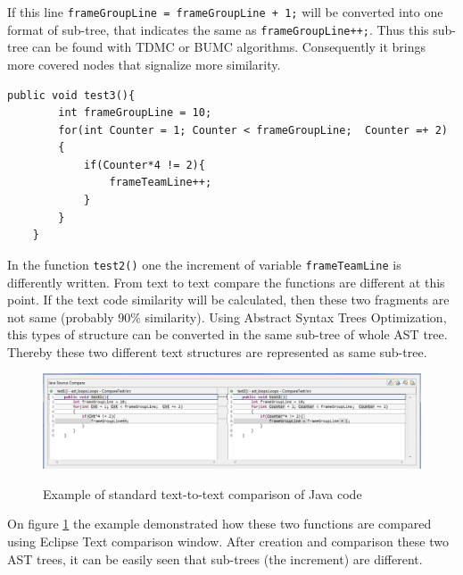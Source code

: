 \documentclass{report}
\begin{document}
If this line \texttt{frameGroupLine = frameGroupLine + 1;} will be converted into one format of sub-tree, that indicates the same as \texttt{frameGroupLine++;}. Thus this sub-tree can be found with TDMC or BUMC algorithms. Consequently it brings more covered nodes that signalize more similarity. 

\begin{lstlisting}[caption= {Normalized function \texttt{test3()} concerning variable \texttt {frameGroupLine}}, label = listing1]
	public void test3(){
		int frameGroupLine = 10;
		for(int Counter = 1; Counter < frameGroupLine;  Counter =+ 2)
		{
			if(Counter*4 != 2){ 
				frameTeamLine++;
			}
		}
	}
\end{lstlisting}

In the function \texttt{test2()} one the increment of variable \texttt{frameTeamLine} is differently written. From text to text compare the functions are different at this point. If the text code similarity will be calculated, then these two fragments are not same (probably $90\%$ similarity). Using Abstract Syntax Trees Optimization, this types of structure can be converted in the same sub-tree of whole AST tree. Thereby these two different text structures are represented as same sub-tree. 

\vspace{4mm}

\begin{figure}[h]
  \centering
  \includegraphics[width=1.00\textwidth]{Figures/AST-optimization/text-to-text-compare}\\[0.1cm]
  \caption[Text to text comparison example]{Example of standard text-to-text comparison of Java code}
  \label{fig:text-to-text-compare}
\end{figure}

On figure \ref{fig:text-to-text-compare} the example demonstrated how these two functions are compared using Eclipse Text comparison window. After creation and comparison these two AST trees, it can be easily seen that sub-trees (the increment) are different.
\end{document}

